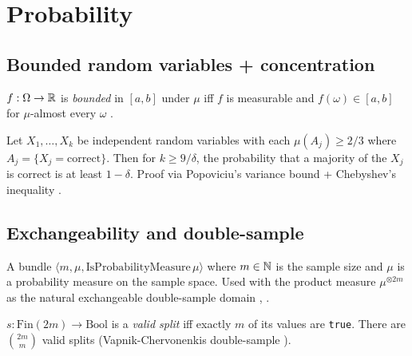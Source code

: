 \chapter{Probability}\label{chap:probability}

\section{Bounded random variables + concentration}\label{sec:concentration}

\begin{defn}
\label{def:bounded-rv}
  \leanok
$f : \Omega \to \mathbb{R}$ is \emph{bounded} in $[a, b]$ under $\mu$ iff
$f$ is measurable and $f(\omega) \in [a, b]$ for $\mu$-almost every
$\omega$ \cite[\S2.6]{boucheron2013concentration}.
\end{defn}

\begin{thm}
\label{thm:chebyshev-majority}
  \leanok
Let $X_1, \dots, X_k$ be independent random variables with each
$\mu(A_j) \ge 2/3$ where $A_j = \{ X_j = \text{correct} \}$. Then for
$k \ge 9 / \delta$, the probability that a majority of the $X_j$ is
correct is at least $1 - \delta$. Proof via Popoviciu's variance
bound + Chebyshev's inequality \cite[\S2]{boucheron2013concentration}.
\end{thm}

\section{Exchangeability and double-sample}\label{sec:exchangeability}

\begin{defn}
\label{def:sample-bundle}
  \leanok
A bundle $\langle m, \mu, \mathrm{IsProbabilityMeasure}\,\mu \rangle$
where $m \in \mathbb{N}$ is the sample size and $\mu$ is a probability measure
on the sample space. Used with the product measure
$\mu^{\otimes 2m}$ as the natural exchangeable double-sample domain
\cite[\S11]{kallenberg}, \cite[Ch.~12]{boucheron2013concentration}.
\end{defn}

\begin{defn}
\label{def:valid-split}
  \leanok
$s : \mathrm{Fin}(2m) \to \mathrm{Bool}$ is a \emph{valid split} iff
exactly $m$ of its values are \texttt{true}. There are
$\binom{2m}{m}$ valid splits (Vapnik-Chervonenkis double-sample
\cite{vapnik1971}).
\end{defn}


